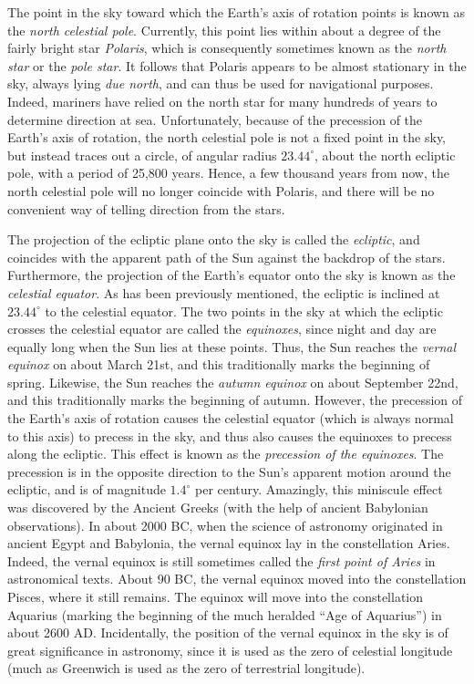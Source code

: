 The point in the sky
toward which the Earth's axis of rotation points is known as the {\em north celestial pole}. Currently,
this point lies within about a degree of the fairly bright star {\em Polaris}, which is consequently sometimes known as the {\em north star}\/
or the {\em pole star}. It follows that Polaris appears to be almost stationary in the sky, always lying {\em due north}, and can thus
be used for navigational purposes. Indeed, mariners have relied on the north star for many hundreds
of years to determine direction at sea. Unfortunately, because of the precession of the
Earth's axis of rotation, the north celestial pole is not a fixed point in the sky, but instead traces out a circle,
of angular radius $23.44^\circ$, about the north ecliptic pole, with a period of 25,800 years.
Hence,  a few thousand years from now, the north celestial pole will no longer coincide with Polaris, and
there will be no convenient way of telling direction from the stars.

The projection of the ecliptic plane onto the sky is called the {\em ecliptic}, and coincides with the
apparent path of the Sun against the backdrop of the stars. Furthermore, the projection of the Earth's equator
onto the sky is known as the {\em celestial equator}. As has been previously mentioned, the ecliptic is inclined at $23.44^\circ$ to the
celestial equator. The two points in the sky at which the ecliptic crosses the celestial equator are
called the {\em equinoxes}, since  night and day are equally
long when the Sun lies at these  points. Thus, the Sun reaches the {\em vernal equinox}\/ on about 
March 21st, and this traditionally marks the beginning of spring. Likewise, the Sun reaches the
{\em autumn equinox}\/ on about September 22nd, and this traditionally marks the beginning of autumn.
However, the precession of the Earth's axis of rotation causes the
celestial equator (which is always normal to this axis) to precess in the sky, and thus also causes the equinoxes to precess along the ecliptic. This
effect is known as the {\em precession of the equinoxes}. The precession  is in the opposite direction to the Sun's apparent motion around the ecliptic,  and is of magnitude $1.4^\circ$ per century. Amazingly, this miniscule
effect was discovered by the Ancient Greeks (with the help of ancient Babylonian observations). In about 2000 BC, when the science of astronomy originated in ancient Egypt and Babylonia, the vernal equinox lay in the constellation Aries. Indeed, the
vernal equinox is still sometimes called the {\em first point of Aries}\/ in astronomical texts. About 90 BC,
the vernal equinox moved into the constellation Pisces, where it still remains. The equinox will move
into the constellation Aquarius (marking the beginning of the much heralded ``Age of Aquarius'') in about 2600 AD. Incidentally, the position of the vernal equinox in the
sky is of great significance in astronomy, since it is used as the zero of celestial longitude (much as
Greenwich is used as the zero of terrestrial longitude). 

